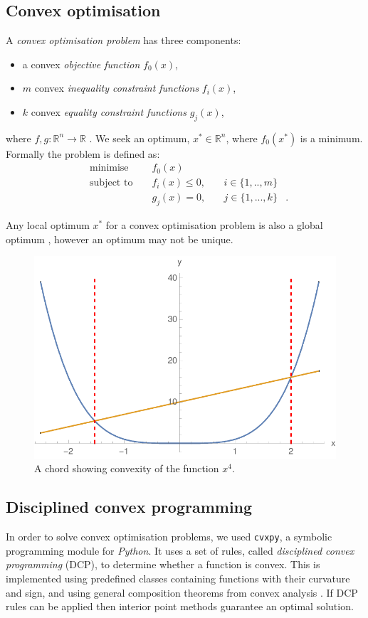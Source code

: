 \documentclass[twocolumn,secnumarabic,amssymb, nobibnotes, aps, prl,superscriptaddress]{revtex4-1}
\begin{document}
\subsection{Convex optimisation}
\noindent A \textit{convex optimisation problem} has three components:
\begin{itemize}
\item a convex \textit{objective function} $f_0(x)$,
\item $m$ convex \textit{inequality constraint functions} $f_i(x)$,
\item $k$ convex \textit{equality constraint functions} $g_j(x)$, 
\end{itemize}
where $f,g: \mathbb{R}^n \rightarrow \mathbb{R}$ \cite[p.141]{cvxpybook}. We seek an optimum, $x^*\in \mathbb{R}^n$, where $f_0(x^*)$ is a minimum. Formally the problem is defined as:
\begin{align} \label{eq:cvxdefn}
&\text{minimise } && f_0(x) & \nonumber &\\
&\text{subject to } && f_i(x) \leq 0,\quad & i\in \{1,..,m\}\nonumber &\\
& && g_{j}(x)=0,\quad & j\in \{1,...,k\} &.
\end{align}

Any local optimum $x^*$ for a convex optimisation problem is also a global optimum \cite[pp.138-139]{cvxpybook}, however an optimum may not be unique.

\begin{figure}[h!]
\includegraphics[width=0.9\linewidth]{convex_function.pdf}
\caption{\label{fig:convex}A chord showing convexity of the function $x^4$.} 
\end{figure}

\subsection{Disciplined convex programming}
\noindent In order to solve convex optimisation problems, we used \texttt{cvxpy}, a symbolic programming module for \textit{Python}\cite{cvxpy}. It uses a set of rules, called \textit{disciplined convex programming} (DCP), to determine whether a function is convex. This is implemented using predefined classes containing functions with their curvature and sign, and using general composition theorems from convex analysis \cite{dcp}. If DCP rules can be applied then interior point methods guarantee an optimal solution.
\end{document}
